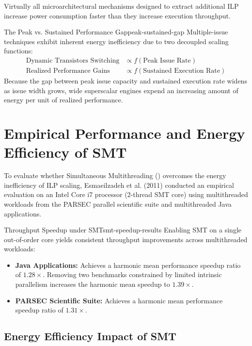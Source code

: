Virtually all microarchitectural mechanisms designed to extract additional ILP increase power consumption faster than they increase execution throughput.

\begin{definition}{The Peak vs. Sustained Performance Gap}{peak-sustained-gap}
Multiple-issue techniques exhibit inherent energy inefficiency due to two decoupled scaling functions:
\begin{align}
\text{Dynamic Transistors Switching} &\propto f(\text{Peak Issue Rate}) \\
\text{Realized Performance Gains} &\propto f(\text{Sustained Execution Rate})
\end{align}
Because the gap between peak issue capacity and sustained execution rate widens as issue width grows, wide superscalar engines expend an increasing amount of energy per unit of realized performance.
\end{definition}

\section{Empirical Performance and Energy Efficiency of SMT}
\label{sec:empirical_smt_performance_energy}

To evaluate whether Simultaneous Multithreading () overcomes the energy inefficiency of ILP scaling, Esmaeilzadeh et al. (2011) conducted an empirical evaluation on an Intel Core i7 processor (2-thread SMT core) using multithreaded workloads from the \textsf{PARSEC} parallel scientific suite and multithreaded Java applications.

\begin{observation}{Throughput Speedup under SMT}{smt-speedup-results}
Enabling SMT on a single out-of-order core yields consistent throughput improvements across multithreaded workloads:
\begin{itemize}
    \item \textbf{Java Applications:} Achieves a harmonic mean performance speedup ratio of $1.28\times$. Removing two benchmarks constrained by limited intrinsic parallelism increases the harmonic mean speedup to $1.39\times$.
    \item \textbf{PARSEC Scientific Suite:} Achieves a harmonic mean performance speedup ratio of $1.31\times$.
\end{itemize}
\end{observation}

\subsection{Energy Efficiency Impact of SMT}


